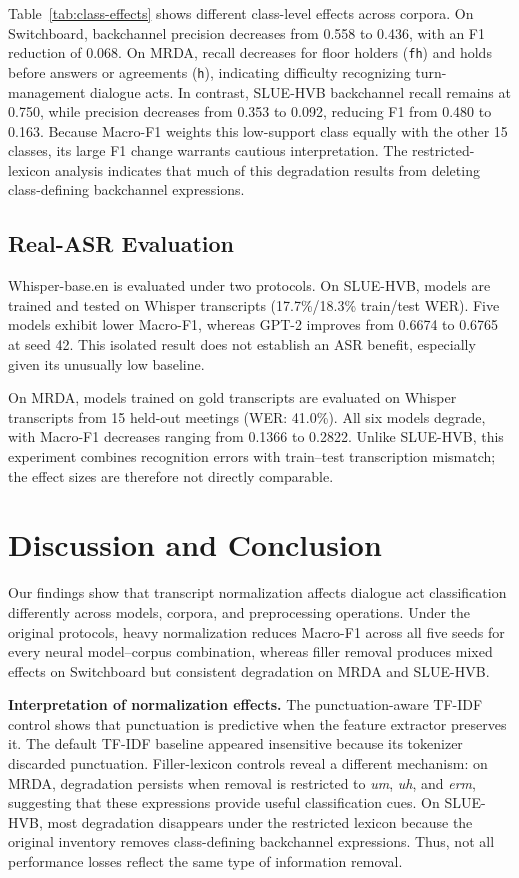 \documentclass[conference]{IEEEtran}
\begin{document}
Table~\ref{tab:class-effects} shows different
class-level effects across corpora. On Switchboard,
backchannel precision decreases from 0.558 to 0.436,
with an F1 reduction of 0.068. On MRDA, recall
decreases for floor holders (\texttt{fh}) and holds
before answers or agreements (\texttt{h}),
indicating difficulty recognizing turn-management
dialogue acts. In contrast, SLUE-HVB backchannel
recall remains at 0.750, while precision decreases
from 0.353 to 0.092, reducing F1 from 0.480 to
0.163. Because Macro-F1 weights this low-support class
equally with the other 15 classes, its large F1
change warrants cautious interpretation.
The restricted-lexicon analysis indicates that
much of this degradation results from deleting
class-defining backchannel expressions.

\subsection{Real-ASR Evaluation}

Whisper-base.en is evaluated under two protocols.
On SLUE-HVB, models are trained and tested on
Whisper transcripts (17.7\%/18.3\% train/test WER).
Five models exhibit lower Macro-F1, whereas
GPT-2 improves from 0.6674 to 0.6765 at seed 42.
This isolated result does not establish an ASR
benefit, especially given its unusually low baseline.

On MRDA, models trained on gold transcripts are
evaluated on Whisper transcripts from 15 held-out
meetings (WER: 41.0\%). All six models degrade,
with Macro-F1 decreases ranging from 0.1366 to
0.2822. Unlike SLUE-HVB, this experiment combines
recognition errors with train--test transcription
mismatch; the effect sizes are therefore not directly
comparable.


\section{Discussion and Conclusion}
\label{sec:conclusion}

Our findings show that transcript normalization affects
dialogue act classification differently across models,
corpora, and preprocessing operations. Under the original
protocols, heavy normalization reduces Macro-F1 across
all five seeds for every neural model--corpus combination,
whereas filler removal produces mixed effects on
Switchboard but consistent degradation on MRDA and
SLUE-HVB.

\textbf{Interpretation of normalization effects.}
The punctuation-aware TF-IDF control shows
that punctuation is predictive when the feature
extractor preserves it. The default TF-IDF
baseline appeared insensitive because its tokenizer
discarded punctuation. Filler-lexicon controls
reveal a different mechanism: on MRDA, degradation
persists when removal is restricted to \textit{um},
\textit{uh}, and \textit{erm}, suggesting that these
expressions provide useful classification cues.
On SLUE-HVB, most degradation disappears under the
restricted lexicon because the original inventory
removes class-defining backchannel expressions.
Thus, not all performance losses reflect the same
type of information removal.
\end{document}
